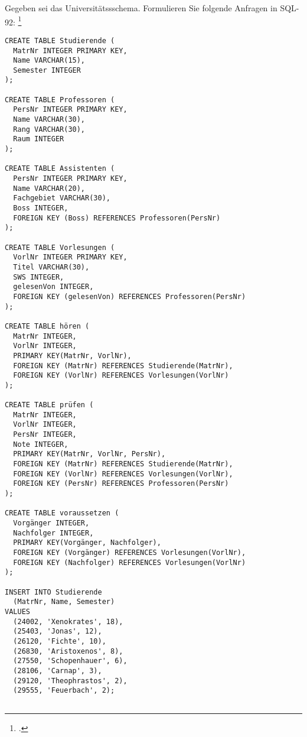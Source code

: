 \documentclass{bschlangaul-aufgabe}
\begin{document}

Gegeben sei das Universitätssschema. Formulieren Sie folgende Anfragen
in SQL-92:
\footcite{examen:66116:2020:03}

\begin{verbatim}
CREATE TABLE Studierende (
  MatrNr INTEGER PRIMARY KEY,
  Name VARCHAR(15),
  Semester INTEGER
);

CREATE TABLE Professoren (
  PersNr INTEGER PRIMARY KEY,
  Name VARCHAR(30),
  Rang VARCHAR(30),
  Raum INTEGER
);

CREATE TABLE Assistenten (
  PersNr INTEGER PRIMARY KEY,
  Name VARCHAR(20),
  Fachgebiet VARCHAR(30),
  Boss INTEGER,
  FOREIGN KEY (Boss) REFERENCES Professoren(PersNr)
);

CREATE TABLE Vorlesungen (
  VorlNr INTEGER PRIMARY KEY,
  Titel VARCHAR(30),
  SWS INTEGER,
  gelesenVon INTEGER,
  FOREIGN KEY (gelesenVon) REFERENCES Professoren(PersNr)
);

CREATE TABLE hören (
  MatrNr INTEGER,
  VorlNr INTEGER,
  PRIMARY KEY(MatrNr, VorlNr),
  FOREIGN KEY (MatrNr) REFERENCES Studierende(MatrNr),
  FOREIGN KEY (VorlNr) REFERENCES Vorlesungen(VorlNr)
);

CREATE TABLE prüfen (
  MatrNr INTEGER,
  VorlNr INTEGER,
  PersNr INTEGER,
  Note INTEGER,
  PRIMARY KEY(MatrNr, VorlNr, PersNr),
  FOREIGN KEY (MatrNr) REFERENCES Studierende(MatrNr),
  FOREIGN KEY (VorlNr) REFERENCES Vorlesungen(VorlNr),
  FOREIGN KEY (PersNr) REFERENCES Professoren(PersNr)
);

CREATE TABLE voraussetzen (
  Vorgänger INTEGER,
  Nachfolger INTEGER,
  PRIMARY KEY(Vorgänger, Nachfolger),
  FOREIGN KEY (Vorgänger) REFERENCES Vorlesungen(VorlNr),
  FOREIGN KEY (Nachfolger) REFERENCES Vorlesungen(VorlNr)
);

INSERT INTO Studierende
  (MatrNr, Name, Semester)
VALUES
  (24002, 'Xenokrates', 18),
  (25403, 'Jonas', 12),
  (26120, 'Fichte', 10),
  (26830, 'Aristoxenos', 8),
  (27550, 'Schopenhauer', 6),
  (28106, 'Carnap', 3),
  (29120, 'Theophrastos', 2),
  (29555, 'Feuerbach', 2);


\end{verbatim}
\end{document}
